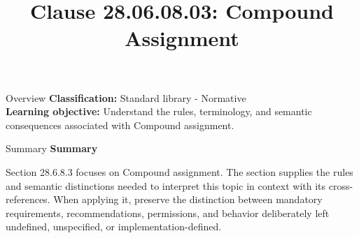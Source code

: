 \documentclass[10pt,letterpaper]{article}
\title{Clause 28.06.08.03: Compound Assignment}
\author{}
\date{}
\begin{document}
\maketitle
\begin{CornellOverviewBox}{Overview}
\textbf{Classification:} Standard library - Normative\\[2pt]
\textbf{Learning objective:} Understand the rules, terminology, and semantic consequences associated with Compound assignment.
\end{CornellOverviewBox}\begin{CornellSummaryBox}{Summary}
{\sffamily\bfseries\color{Accent} Summary}\par\vspace{3pt}Section 28.6.8.3 focuses on Compound assignment. The section supplies the rules and semantic distinctions needed to interpret this topic in context with its cross-references. When applying it, preserve the distinction between mandatory requirements, recommendations, permissions, and behavior deliberately left undefined, unspecified, or implementation-defined.
\end{CornellSummaryBox}
\end{document}

